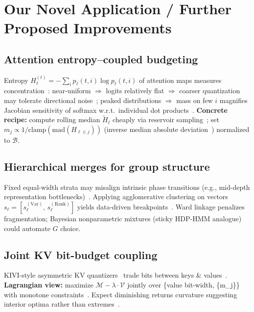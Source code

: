 \documentclass[conference]{IEEEtran}
\begin{document}
\section{Our Novel Application / Further Proposed Improvements}
\label{sec:novel}

\subsection{Attention entropy--coupled budgeting}

Entropy $H_\ell^{(t)}=-\sum_i p_{\ell}(t,i)\log p_{\ell}(t,i)$ of attention maps measures concentration~\cite{presentation_mqjl}: near-uniform \(\Rightarrow\) logits relatively flat \(\Rightarrow\) coarser quantization may tolerate directional noise~\cite{vitspec2021}; peaked distributions \(\Rightarrow\) mass on few \(i\) magnifies Jacobian sensitivity of softmax w.r.t.\ individual dot products~\cite{presentation_mqjl}. \textbf{Concrete recipe:} compute rolling median \(\tilde H_\ell\) cheaply via reservoir sampling~\cite{presentation_mqjl}; set \(m_j\propto 1/\mathrm{clamp}(\mathrm{mad}(H_{\ell\in j}))\) (inverse median absolute deviation~\cite{rudelson2014}) normalized to \(\mathcal{B}\).

\subsection{Hierarchical merges for group structure}

Fixed equal-width strata may misalign intrinsic phase transitions (e.g., mid-depth representation bottlenecks)~\cite{touvron2023llama}. Applying agglomerative clustering on vectors \(s_{\ell}= [ s_{\ell}^{(\mathrm{Var})},\, s_{\ell}^{(\mathrm{Rank})} ]\) yields data-driven breakpoints~\cite{presentation_mqjl}. Ward linkage penalizes fragmentation; Bayesian nonparametric mixtures (sticky HDP-HMM analogue)~\cite{presentation_mqjl} could automate \(G\) choice.

\subsection{Joint KV bit-budget coupling}

KIVI-style asymmetric KV quantizers~\cite{kivi2024} trade bits between keys \& values~\cite{kivi2024}. \textbf{Lagrangian view:} maximize \(\mathcal{M}-\lambda\cdot \mathcal{V}\) jointly over \{value bit-width, \{m\_j\}\} with monotone constraints~\cite{presentation_mqjl}. Expect diminishing returns curvature suggesting interior optima rather than extremes~\cite{fpguide2018}.
\end{document}
